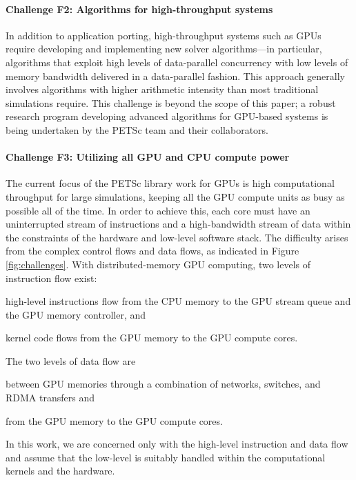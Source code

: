 \documentclass[5p,times]{elsarticle}
\newenvironment{titemize} %
        {\begin{list}{\labelitemi}{
                \setlength{\topsep}{0pt}
                \setlength{\parskip}{0pt}
                \setlength{\itemsep}{0pt}
                \setlength{\parsep}{0pt}
                \setlength{\leftmargin}{23pt}
                \setlength{\labelwidth}{23pt}
        }}
        {\end{list}}
\begin{document}
\paragraph{Challenge F2: Algorithms for high-throughput systems}

In addition to application porting, high-throughput systems such as GPUs require developing and implementing new solver algorithms---in particular, algorithms that exploit high levels of
data-parallel concurrency with  low levels of memory bandwidth delivered in a data-parallel fashion. This approach
generally involves algorithms with higher arithmetic intensity than most traditional simulations require.
This challenge is beyond the scope of this paper;  a robust research program developing advanced algorithms for GPU-based systems is being undertaken by the PETSc team and their collaborators.

\paragraph{Challenge F3: Utilizing all GPU and CPU compute power}


The current focus of the PETSc library work for GPUs is high computational throughput for large simulations,
keeping all the GPU compute units as busy as possible all of the time. 
In order to achieve this, each core must have an uninterrupted stream of instructions and a high-bandwidth stream of data within the constraints of the hardware
and low-level software stack.
The difficulty arises from the complex control flows and data flows, as indicated in Figure \ref{fig:challenges}. With distributed-memory GPU computing, two levels
of instruction flow exist:
\begin{titemize}
\item high-level instructions flow from the CPU memory to the GPU stream queue and the GPU memory controller, and
\item kernel code flows from the GPU memory to the GPU compute cores.
\end{titemize}
The two levels of data flow are
\begin{titemize}
\item between GPU memories through a combination of networks, switches, and RDMA transfers and
\item from the GPU memory to the GPU compute cores.
\end{titemize}
In this work, we are concerned only with the high-level instruction and data flow and assume that the low-level is suitably handled within the computational kernels and the hardware.
\end{document}
